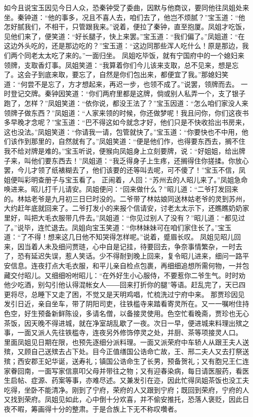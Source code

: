 \documentclass[12pt,oneside]{book}
\begin{document}
如今且说宝玉因见今日人众，恐秦钟受了委曲，因默与他商议，要同他往凤姐处来坐。秦钟道：“他的事多，况且不喜人去，咱们去了，他岂不烦腻？”宝玉道：“他怎好腻我们，不相干，只管跟我来。”说着，便拉了秦钟，直至抱厦。凤姐才吃饭，见他们来了，便笑道：“好长腿子，快上来罢。”宝玉道：“我们偏了。”凤姐道：“在这边外头吃的，还是那边吃的？”宝玉道：“这边同那些浑人吃什么！原是那边，我们两个同老太太吃了来的。”一面归坐。
凤姐吃毕饭，就有宁国府中的一个媳妇来领牌，支取香灯事。凤姐笑道：“我算着你们今儿该来支取，总不见来，想是忘了。这会子到底来取，要忘了，自然是你们包出来，都便宜了我。”那媳妇笑道：“何尝不是忘了，方才想起来，再迟一步，也领不成了。”说罢，领牌而去。
一时登记交牌。秦钟因笑道：“你们两府里都是这牌，倘或别人私弄一个，支了银子跑了，怎样？”凤姐笑道：“依你说，都没王法了？”宝玉因道：“怎么咱们家没人来领牌子做东西？”凤姐道：“人家来领的时候，你还做梦呢！我且问你，你们这夜书多早晚才念呢？”宝玉道：“巴不得这如今就念才好，他们只是不快收拾出书房来，这也没法。”凤姐笑道：“你请我一请，包管就快了。”宝玉道：“你要快也不中用，他们该作到那里的，自然就有了。”凤姐笑道：“便是他们作，也得要东西去，搁不住我不给对牌是难的。”宝玉听说，便猴向凤姐身上立刻要牌，说：“好姐姐，给出牌子来，叫他们要东西去！”凤姐道：“我乏得身子上生疼，还搁得住你搓揉。你放心罢，今儿才领了纸裱糊去了，他们该要的还等叫去呢，可不傻了！”宝玉不信，凤姐便叫彩明查册子与宝玉看了。
正闹着，人回：“苏州去的人昭儿来了。”凤姐急命唤进来。昭儿打千儿请安。凤姐便问：“回来做什么？”昭儿道：“二爷打发回来的。林姑老爷是九月初三日巳时没的。二爷带了林姑娘同送林姑老爷的灵到苏州，大约赶年底就回来了。二爷打发小的来报个信请安，讨老太太示下，还瞧瞧奶奶家里好，叫把大毛衣服带几件去。”凤姐道：“你见过别人了没有？”昭儿道：“都见过了。”说毕，连忙退去。凤姐向宝玉笑道：“你林妹妹可在咱们家住长了。”宝玉道：“了不得！想来这几日他不知哭得怎样呢。”说着，蹙眉长叹。
凤姐见昭儿回来，因当着人未及细问贾琏，心中自是记挂，待要回去，争奈事情繁杂，一时去了，恐有延迟失误，惹人笑话。少不得耐到晚上回来，复令昭儿进来，细问一路平安信息。连夜打点大毛衣服，和平儿亲自检点包裹，再细细追想所需何物，一并包藏交付昭儿。又细细吩咐昭儿：“在外好生小心服侍，不要惹你二爷生气。时时劝他少吃酒，别勾引他认得混帐女人――回来打折你的腿”等语。赶乱完了，天已四更将尽，总睡下又走了困，不觉又是天明鸡唱，忙梳洗过宁府中来。
那贾珍因见发引日近，亲自坐车，带了阴阳司吏，往铁槛寺来踏看寄灵所在。又一一嘱咐住持色空，好生预备新鲜陈设，多请名僧，以备接灵使用。色空忙看晚斋，贾珍也无心茶饭，因天晚不得进城，就在净室胡乱歇了一夜。次日一早，便进城来料理出殡之事，一面又派人先往铁槛寺，连夜另外修饰停灵之处，并厨、茶等项接灵人口。
里面凤姐见日期在限，也预先逐细分派料理。一面又派荣府中车轿人从跟王夫人送殡，又顾自己送殡去占下处。目今正值缮国公诰命亡故，王、邢二夫人又去打祭送殡；西安郡王妃华诞，送寿礼；镇国公诰命生了长男，预备贺礼；又有胞兄王仁连家眷回南，一面写家信禀叩父母并带往之物；又有迎春染病，每日请医服药，看医生启帖、症源、药案等事，亦难尽述。又兼发引在迩，因此忙得凤姐茶饭也没工夫吃得，坐卧不能清净。刚到了宁府，荣府的人又跟到宁府；既回到荣府，宁府的人又找到荣府。凤姐见如此，心中倒十分欢喜，并不偷安推托，恐落人褒贬，因此日夜不暇，筹画得十分的整肃。于是合族上下无不称叹囋者。
\end{document}
